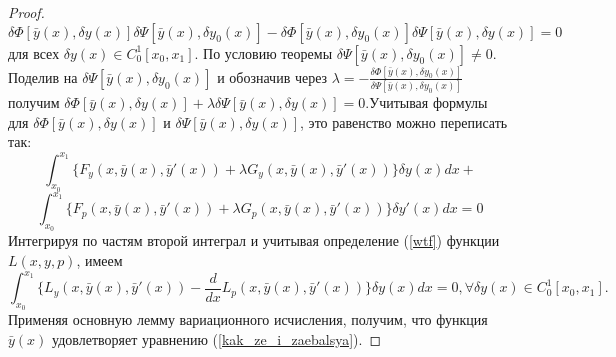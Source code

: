 \begin{proof}
    $$\delta \Phi[\bar y(x), \delta y(x)]\delta \Psi[\bar y(x), \delta y_0(x)] - \delta \Phi[\bar y(x), \delta y_0(x)]\delta\Psi[\bar y(x), \delta y(x)] = 0$$
    для всех $\delta y(x) \in C^1_0[x_0, x_1]$. По условию теоремы $\delta\Psi[\bar y(x), \delta y_0(x)] \neq 0$. Поделив на $\delta \Psi[\bar y(x), \delta y_0(x)]$ и обозначив через $\lambda=-\frac{\delta\Phi[\bar y(x), \delta y_0(x)]}{\delta\Psi[\bar y(x), \delta y_0(x)]}$ получим $\delta\Phi[\bar y(x), \delta y(x)] + \lambda\delta\Psi[\bar y(x), \delta y(x)] = 0$.Учитывая формулы для $\delta\Phi[\bar y(x),\delta y(x)]$ и $\delta\Psi[\bar y(x), \delta y(x)]$, это равенство можно переписать так:
    $$\int_{x_0}^{x_1}\Big\{ F_y(x, \bar y(x), \bar y'(x)) + \lambda G_y(x, \bar y(x), \bar y'(x))\Big\}\delta y(x)dx+$$
    $$\int_{x_0}^{x_1}\Big\{ F_p(x, \bar y(x), \bar y'(x)) + \lambda G_p(x, \bar y(x), \bar y'(x))\Big\}\delta y'(x)dx=0$$
    Интегрируя по частям второй интеграл и учитывая определение (\ref{wtf}) функции $L(x, y, p)$, имеем
    $$\int_{x_0}^{x_1} \Big\{ L_y(x,\bar y(x),\bar y'(x)) - \frac{d}{dx} L_p(x,\bar y(x),\bar y'(x))\Big\}\delta y(x)dx = 0, \forall\delta y(x) \in C^1_0[x_0, x_1].$$
    Применяя основную лемму вариационного исчисления, получим, что функция $\bar y(x)$ удовлетворяет уравнению (\ref{kak_ze_i_zaebalsya}).
    
\end{proof}
